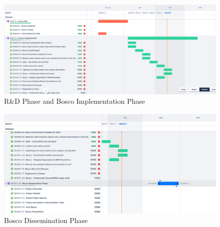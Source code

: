 \documentclass[12pt,a4paper,titlepage]{report}
\begin{document}
\begin{figure}[ht]
 \centering
 \includegraphics[width=15cm]{./diagrams/sprints1.png}
 \caption{R\&D Phase and Bosco Implementation Phase}
\end{figure}

\begin{figure}[ht]
 \centering
 \includegraphics[width=15cm]{./diagrams/sprints2.png}
 \caption{Bosco Dissemination Phase}
\end{figure}

\printbibliography[title={References}]
\end{document}
